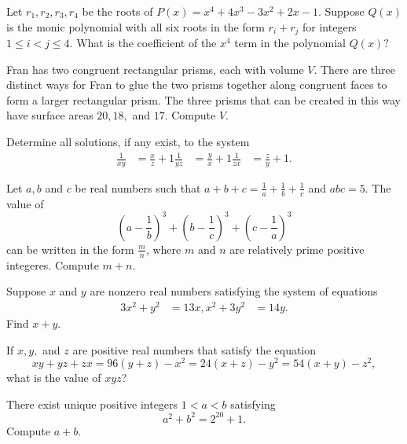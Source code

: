 \documentclass{article}
\begin{document}
  
\begin{prob}[JMC 10 2021/22]{5}
Let $r_1,r_2,r_3,r_4$ be the roots of $P(x)= x^4+4x^3-3x^2+2x-1.$ Suppose $Q(x)$ is the monic polynomial with all six roots in the form $r_{i}+r_{j}$ for integers $1\le i < j \le 4.$ What is the coefficient of the $x^4$ term in the polynomial $Q(x)?$
\end{prob}


\begin{prob}{5}
Fran has two congruent rectangular prisms, each with volume $V$. There are three distinct ways for Fran to glue the two prisms together along congruent faces to form a larger rectangular prism. The three prisms that can be created in this way have surface areas $20,18,$ and $17$. Compute $V$.
\end{prob}


\begin{prob}[vvluo]{6}
Determine all solutions, if any exist, to the system
\begin{align*}
\frac{1}{xy}&=\frac{x}{z}+1 
\frac{1}{yz}&=\frac{y}{x}+1 
\frac{1}{zx}&=\frac{z}{y}+1.
\end{align*}
\end{prob}


\begin{prob}[BMT 2020]{6}
Let $a,b$ and $c$ be real numbers such that $a+b+c=\frac{1}{a}+\frac{1}{b}+\frac{1}{c}$ and $abc=5$. The value of
\[(a-\frac{1}{b})^3+(b-\frac{1}{c})^3+(c-\frac{1}{a})^3\]
can be written in the form $\frac{m}{n}$, where $m$ and $n$ are relatively prime positive integeres. Compute $m+n$.
\end{prob}

\begin{prob}{6}
Suppose $x$ and $y$ are nonzero real numbers satisfying the system of equations
\begin{align*}
    3x^2 + y^2 &= 13x,
    x^2 + 3y^2 &= 14y.
\end{align*}
Find $x+y$.
\end{prob}



\begin{req}[JMC 10 2021/18]{9}
If $x,y,$ and $z$ are positive real numbers that satisfy the equation
\[xy+yz+zx=96(y+z)-x^2 = 24(x+z) -y^2 = 54(x+y) -z^2,\]
what is the value of $xyz$?
\end{req}

\begin{prob}[CARML 2019/8]{13}
There exist unique positive integers $1<a<b$ satisfying
\[a^2+b^2=2^{20}+1.\]
Compute $a+b$.
\end{prob}
\end{document}
